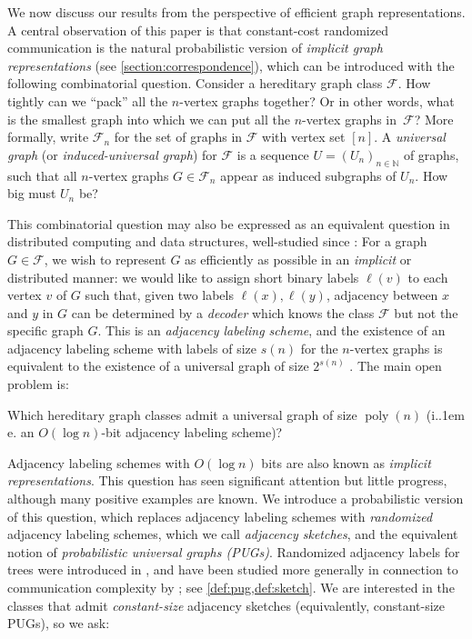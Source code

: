 \documentclass{theoretics}
\makeatletter
\DeclareMathOperator{\poly}{poly}
\newcommand{\cF}{\ensuremath{\mathcal{F}}}
\newcommand{\bN}{\ensuremath{\mathbb{N}}}
\newcommand*\ie{i.\kern.1em e.\@\xspace} %
\makeatother
\begin{document}
We now discuss our results from the perspective of efficient graph representations.  A central
observation of this paper is that constant-cost randomized communication is the natural
probabilistic version of \emph{implicit graph representations} (see \cref{section:correspondence}),
which can be introduced with the following combinatorial question. Consider a hereditary graph class
$\cF$. How tightly can we ``pack'' all the $n$-vertex graphs together? Or in other words, what is
the smallest graph into which we can put all the $n$-vertex graphs in~$\cF$?  More formally, write
$\cF_n$ for the set of graphs in $\cF$ with vertex set $[n]$.  A \emph{universal graph} (or
\emph{induced-universal graph}) for $\cF$ is a sequence $U = (U_n)_{n \in \bN}$ of graphs, such that
all $n$-vertex graphs $G \in \cF_n$ appear as induced subgraphs of $U_n$. How big must $U_n$ be? 

This combinatorial question may also be expressed as an equivalent question in
distributed computing and data structures, well-studied since \cite{Mul89,KNR92}: For a graph $G \in
\cF$, we wish to represent $G$ as efficiently as possible in an \emph{implicit} or distributed
manner: we would like to assign short binary labels $\ell(v)$ to each vertex $v$ of $G$ such that,
given two labels $\ell(x), \ell(y)$, adjacency between $x$ and $y$ in $G$ can be determined by a
\emph{decoder} which knows the class $\cF$ but not the specific graph $G$. This is an
\emph{adjacency labeling scheme}, and the existence of an adjacency labeling scheme with labels of
size $s(n)$ for the $n$-vertex graphs is equivalent to the existence of a universal graph of size
$2^{s(n)}$ \cite{KNR92}. The main open problem is:

\begin{question}
Which hereditary graph classes admit a universal graph of size $\poly(n)$ (\ie an $O(\log n)$-bit
adjacency labeling scheme)? 
\end{question}

Adjacency labeling schemes with $O(\log n)$ bits are also known as \emph{implicit representations}.
This question has seen significant attention but little progress, although many positive examples
are known.  We introduce a probabilistic version of this question, which replaces adjacency labeling
schemes with \emph{randomized} adjacency labeling schemes, which we call \emph{adjacency sketches},
and the equivalent notion of \emph{probabilistic universal graphs (PUGs)}. Randomized adjacency
labels for trees were introduced in \cite{FK09}, and have been studied more generally in connection
to communication complexity by \cite{Har20}; see \cref{def:pug,def:sketch}. We are interested in the
classes that admit \emph{constant-size} adjacency sketches (equivalently, constant-size PUGs), so we
ask:
\end{document}
